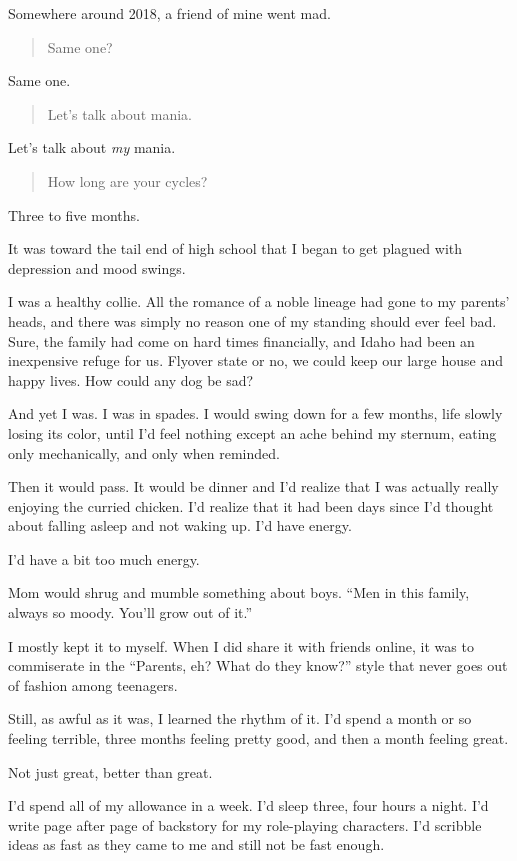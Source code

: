 Somewhere around 2018, a friend of mine went mad.

\begin{quote}
Same one?
\end{quote}

Same one.

\begin{quote}
Let's talk about mania.
\end{quote}

Let's talk about \emph{my} mania.

\begin{quote}
How long are your cycles?
\end{quote}

Three to five months.

It was toward the tail end of high school that I began to get plagued with depression and mood swings.

I was a healthy collie. All the romance of a noble lineage had gone to my parents' heads, and there was simply no reason one of my standing should ever feel bad. Sure, the family had come on hard times financially, and Idaho had been an inexpensive refuge for us. Flyover state or no, we could keep our large house and happy lives. How could any dog be sad?

And yet I was. I was in spades. I would swing down for a few months, life slowly losing its color, until I'd feel nothing except an ache behind my sternum, eating only mechanically, and only when reminded.

Then it would pass. It would be dinner and I'd realize that I was actually really enjoying the curried chicken. I'd realize that it had been days since I'd thought about falling asleep and not waking up. I'd have energy.

I'd have a bit too much energy.

Mom would shrug and mumble something about boys. ``Men in this family, always so moody. You'll grow out of it.''

I mostly kept it to myself. When I did share it with friends online, it was to commiserate in the ``Parents, eh? What do they know?'' style that never goes out of fashion among teenagers.

Still, as awful as it was, I learned the rhythm of it. I'd spend a month or so feeling terrible, three months feeling pretty good, and then a month feeling great.

Not just great, better than great.

I'd spend all of my allowance in a week. I'd sleep three, four hours a night. I'd write page after page of backstory for my role-playing characters. I'd scribble ideas as fast as they came to me and still not be fast enough.

